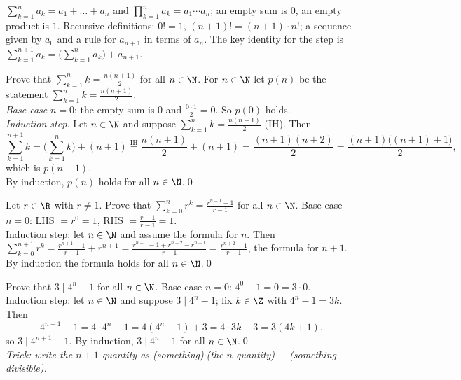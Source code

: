 \begin{key}
$\sum_{k=1}^{n}a_k=a_1+\dots+a_n$ and $\prod_{k=1}^na_k=a_1\cdots a_n$; an empty sum is $0$, an empty product is $1$. Recursive definitions: $0!=1$, $(n+1)!=(n+1)\cdot n!$; a sequence given by $a_0$ and a rule for $a_{n+1}$ in terms of $a_n$. The key identity for the step is $\sum_{k=1}^{n+1}a_k=\big(\sum_{k=1}^na_k\big)+a_{n+1}$.
\end{key}

\begin{hexample}
Prove that $\displaystyle\sum_{k=1}^{n}k=\frac{n(n+1)}2$ for all $n\in\N$.
\solution
For $n\in\N$ let $p(n)$ be the statement $\sum_{k=1}^nk=\frac{n(n+1)}2$.\\
\emph{Base case} $n=0$: the empty sum is $0$ and $\frac{0\cdot1}2=0$. So $p(0)$ holds.\\
\emph{Induction step.} Let $n\in\N$ and suppose $\sum_{k=1}^nk=\frac{n(n+1)}2$ (IH). Then
\[
\sum_{k=1}^{n+1}k=\Big(\sum_{k=1}^{n}k\Big)+(n+1)\overset{\text{IH}}{=}\frac{n(n+1)}2+(n+1)=\frac{(n+1)(n+2)}2=\frac{(n+1)\big((n+1)+1\big)}2,
\]
which is $p(n+1)$.\\
By induction, $p(n)$ holds for all $n\in\N$.\qed
\end{hexample}

\begin{hexample}
Let $r\in\R$ with $r\ne1$. Prove that $\displaystyle\sum_{k=0}^{n}r^k=\frac{r^{n+1}-1}{r-1}$ for all $n\in\N$.
\solution
Base case $n=0$: LHS $=r^0=1$, RHS $=\frac{r-1}{r-1}=1$.\\
Induction step: let $n\in\N$ and assume the formula for $n$. Then
$\sum_{k=0}^{n+1}r^k=\frac{r^{n+1}-1}{r-1}+r^{n+1}=\frac{r^{n+1}-1+r^{n+2}-r^{n+1}}{r-1}=\frac{r^{n+2}-1}{r-1}$, the formula for $n+1$.\\
By induction the formula holds for all $n\in\N$.\qed
\end{hexample}

\begin{hexample}[divisibility]
Prove that $3\mid 4^n-1$ for all $n\in\N$.
\solution
Base case $n=0$: $4^0-1=0=3\cdot0$. \\
Induction step: let $n\in\N$ and suppose $3\mid4^n-1$; fix $k\in\Z$ with $4^n-1=3k$. Then
\[
4^{n+1}-1=4\cdot4^n-1=4(4^n-1)+3=4\cdot3k+3=3(4k+1),
\]
so $3\mid4^{n+1}-1$. By induction, $3\mid4^n-1$ for all $n\in\N$.\qed\\
\emph{Trick: write the $n+1$ quantity as (something)$\cdot$(the $n$ quantity) $+$ (something divisible).}
\end{hexample}

